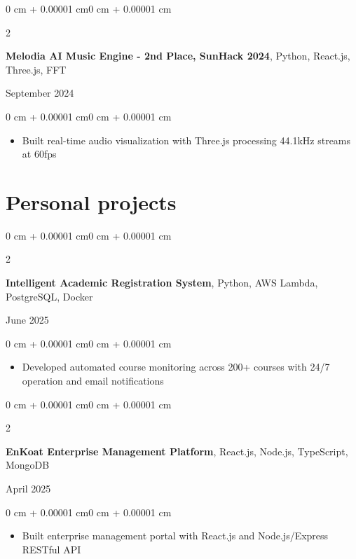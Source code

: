 \documentclass[10pt]{article}
\newenvironment{highlights}{
    \begin{itemize}[
        topsep=0.10 cm,
        parsep=0.10 cm,
        partopsep=0pt,
        itemsep=0pt,
        leftmargin=0 cm + 10pt
    ]
}{
    \end{itemize}
}
\newenvironment{onecolentry}{
    \begin{adjustwidth}{0 cm + 0.00001 cm}{0 cm + 0.00001 cm}
}{
    \end{adjustwidth}
}
\newenvironment{twocolentry}[2][]{
    \onecolentry
    \def\secondColumn{#2}
    \setcolumnwidth{\fill, 4.5 cm}
    \begin{paracol}{2}
}{
    \switchcolumn \raggedleft \secondColumn
    \end{paracol}
    \endonecolentry
}
\begin{document}
    \vspace{0.15cm}
    
    \begin{twocolentry}{September 2024}
        \textbf{Melodia AI Music Engine - 2nd Place, SunHack 2024}, Python, React.js, Three.js, FFT
    \end{twocolentry}
    
    \begin{onecolentry}
        \begin{highlights}
            \item Built real-time audio visualization with Three.js processing 44.1kHz streams at 60fps
        \end{highlights}
    \end{onecolentry}

    \section{Personal projects}

    \begin{twocolentry}{June 2025}
        \textbf{Intelligent Academic Registration System}, Python, AWS Lambda, PostgreSQL, Docker
    \end{twocolentry}
    
    \begin{onecolentry}
        \begin{highlights}
            \item Developed automated course monitoring across 200+ courses with 24/7 operation and email notifications
        \end{highlights}
    \end{onecolentry}
    
    \vspace{0.05cm}
    
    \begin{twocolentry}{April 2025}
        \textbf{EnKoat Enterprise Management Platform}, React.js, Node.js, TypeScript, MongoDB
    \end{twocolentry}
    
    \begin{onecolentry}
        \begin{highlights}
            \item Built enterprise management portal with React.js and Node.js/Express RESTful API
        \end{highlights}
    \end{onecolentry}
\end{document}

